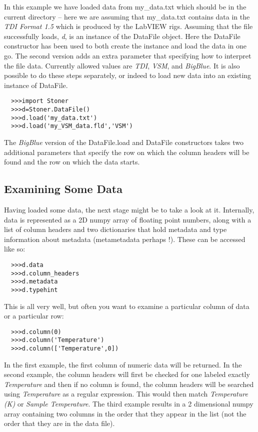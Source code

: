 \documentclass[a4paper,11pt]{scrartcl}
\begin{document}
In this example we have loaded data from my\_data.txt which should be in the current directory -- here we are assuming that my\_data.txt contains data in the \textit{TDI Format 1.5} which is produced by the LabVIEW rigs. Assuming that the file successfully loads, \textit{d}, is an instance of the DataFile object. Here the DataFile constructor has been used to both create the instance and load the data in one go. The second version adds an extra parameter that specifying how to interpret the file data. Currently allowed values are \textit{TDI}, \textit{VSM}, and \textit{BigBlue}. It is also possible to do these steps separately, or indeed to load new data into an existing instance of DataFile.

\begin{verbatim}
  >>>import Stoner
  >>>d=Stoner.DataFile()
  >>>d.load('my_data.txt')
  >>>d.load('my_VSM_data.fld','VSM')
\end{verbatim}

The \textit{BigBlue} version of the DataFile.load and DataFile constructors takes two additional parameters that specify the row on which the column headers will be found and the row on which the data starts.

\subsection{Examining Some Data}

Having loaded some data, the next stage might be to take a look at it. Internally, data is represented as a 2D numpy array of floating point numbers, along with a list of column headers and two dictionaries that hold metadata and type information about metadata (metametadata perhaps !). These can be accessed like so:
\begin{verbatim}
  >>>d.data
  >>>d.column_headers
  >>>d.metadata
  >>>d.typehint
\end{verbatim}
This is all very well, but often you want to examine a particular column of data or a particular row:
\begin{verbatim}
  >>>d.column(0)
  >>>d.column('Temperature')
  >>>d.column(['Temperature',0])
\end{verbatim}
In the first example, the first column of numeric data will be returned. In the second example, the column headers will first be checked for one labeled exactly \textit{Temperature} and then if no column is found, the column headers will be searched using \textit{Temperature} as a regular expression. This would then match \textit{Temperature (K)} or \textit{Sample Temperature}.  The third example results in a 2 dimensional numpy array containing two columns in the order that they appear in the list (\ie not the order that they are in the data file).
\end{document}
